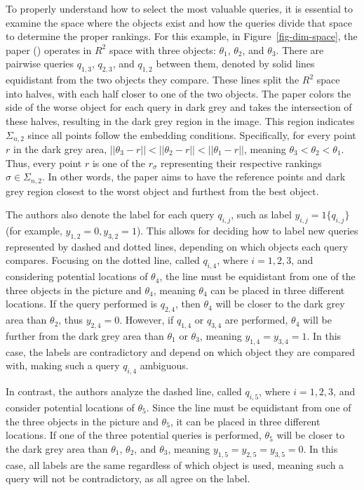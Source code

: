 \documentclass[
  letterpaper,
  numbers=noenddot,
  DIV=11]{scrreprt}
\theoremstyle{definition}
\theoremstyle{plain}
\theoremstyle{plain}
\theoremstyle{remark}
\begin{document}
To properly understand how to select the most valuable queries, it is
essential to examine the space where the objects exist and how the
queries divide that space to determine the proper rankings. For this
example, in Figure~\ref{fig-dim-space}, the paper
() operates in \(R^2\) space
with three objects: \(\theta_1\), \(\theta_2\), and \(\theta_3\). There
are pairwise queries \(q_{1,3}\), \(q_{2,3}\), and \(q_{1,2}\) between
them, denoted by solid lines equidistant from the two objects they
compare. These lines split the \(R^2\) space into halves, with each half
closer to one of the two objects. The paper colors the side of the worse
object for each query in dark grey and takes the intersection of these
halves, resulting in the dark grey region in the image. This region
indicates \(\Sigma_{n,2}\) since all points follow the embedding
conditions. Specifically, for every point \(r\) in the dark grey area,
\(||\theta_3 - r|| < ||\theta_2 - r|| < ||\theta_1 - r||\), meaning
\(\theta_3 < \theta_2 < \theta_1\). Thus, every point \(r\) is one of
the \(r_\sigma\) representing their respective rankings
\(\sigma \in \Sigma_{n,2}\). In other words, the paper aims to have the
reference points and dark grey region closest to the worst object and
furthest from the best object.

The authors also denote the label for each query \(q_{i,j}\), such as
label \(y_{i,j} = 1\{q_{i,j}\}\) (for example,
\(y_{1,2} = 0, y_{3,2} = 1\)). This allows for deciding how to label new
queries represented by dashed and dotted lines, depending on which
objects each query compares. Focusing on the dotted line, called
\(q_{i,4}\), where \(i={1,2,3}\), and considering potential locations of
\(\theta_4\), the line must be equidistant from one of the three objects
in the picture and \(\theta_4\), meaning \(\theta_4\) can be placed in
three different locations. If the query performed is \(q_{2,4}\), then
\(\theta_4\) will be closer to the dark grey area than \(\theta_2\),
thus \(y_{2,4} = 0\). However, if \(q_{1,4}\) or \(q_{3,4}\) are
performed, \(\theta_4\) will be further from the dark grey area than
\(\theta_1\) or \(\theta_3\), meaning \(y_{1,4} = y_{3,4} = 1\). In this
case, the labels are contradictory and depend on which object they are
compared with, making such a query \(q_{i,4}\) ambiguous.

In contrast, the authors analyze the dashed line, called \(q_{i,5}\),
where \(i={1,2,3}\), and consider potential locations of \(\theta_5\).
Since the line must be equidistant from one of the three objects in the
picture and \(\theta_5\), it can be placed in three different locations.
If one of the three potential queries is performed, \(\theta_5\) will be
closer to the dark grey area than \(\theta_1\), \(\theta_2\), and
\(\theta_3\), meaning \(y_{1,5} = y_{2,5} = y_{3,5} = 0\). In this case,
all labels are the same regardless of which object is used, meaning such
a query will not be contradictory, as all agree on the label.
\end{document}
